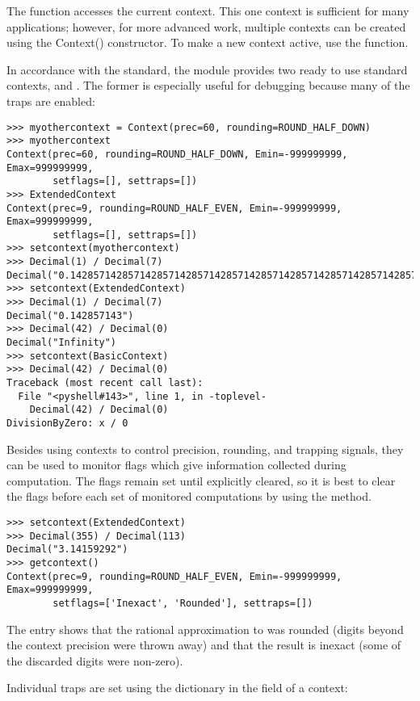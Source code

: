 The  function accesses the current context.  This one
context is sufficient for many applications; however, for more advanced work,
multiple contexts can be created using the Context() constructor.  To make a
new context active, use the  function.

In accordance with the standard, the  module provides two
ready to use standard contexts,  and
. The former is especially useful for debugging
because many of the traps are enabled:

\begin{verbatim}
>>> myothercontext = Context(prec=60, rounding=ROUND_HALF_DOWN)
>>> myothercontext
Context(prec=60, rounding=ROUND_HALF_DOWN, Emin=-999999999, Emax=999999999,
        setflags=[], settraps=[])
>>> ExtendedContext
Context(prec=9, rounding=ROUND_HALF_EVEN, Emin=-999999999, Emax=999999999,
        setflags=[], settraps=[])
>>> setcontext(myothercontext)
>>> Decimal(1) / Decimal(7)
Decimal("0.142857142857142857142857142857142857142857142857142857142857")
>>> setcontext(ExtendedContext)
>>> Decimal(1) / Decimal(7)
Decimal("0.142857143")
>>> Decimal(42) / Decimal(0)
Decimal("Infinity")
>>> setcontext(BasicContext)
>>> Decimal(42) / Decimal(0)
Traceback (most recent call last):
  File "<pyshell#143>", line 1, in -toplevel-
    Decimal(42) / Decimal(0)
DivisionByZero: x / 0
\end{verbatim}

Besides using contexts to control precision, rounding, and trapping signals,
they can be used to monitor flags which give information collected during
computation.  The flags remain set until explicitly cleared, so it is best to
clear the flags before each set of monitored computations by using the
 method.

\begin{verbatim}
>>> setcontext(ExtendedContext)
>>> Decimal(355) / Decimal(113)
Decimal("3.14159292")
>>> getcontext()
Context(prec=9, rounding=ROUND_HALF_EVEN, Emin=-999999999, Emax=999999999,
        setflags=['Inexact', 'Rounded'], settraps=[])
\end{verbatim}

The  entry shows that the rational approximation to
 was rounded (digits beyond the context precision were thrown
away) and that the result is inexact (some of the discarded digits were
non-zero).

Individual traps are set using the dictionary in the 
field of a context:

